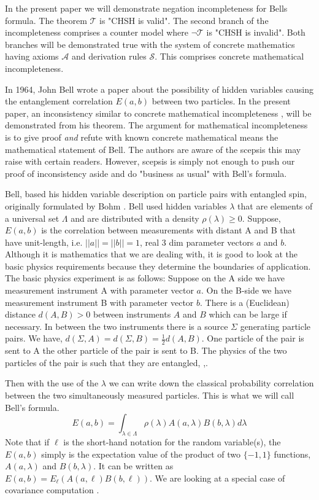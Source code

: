 \documentclass{appolb}
\begin{document}
In the present paper we will demonstrate negation incompleteness for Bells formula. The theorem $\mathcal{T}$ is "CHSH is valid". The second branch of the incompleteness comprises a counter model where $\neg\mathcal{T}$ is "CHSH is invalid". Both branches will be demonstrated true with the system of concrete mathematics having axioms $\mathcal{A}$ and derivation rules $\mathcal{S}$. This comprises concrete mathematical incompleteness.

In 1964, John Bell wrote a paper \cite{2} about the possibility of hidden variables \cite{1} causing the entanglement correlation $E(a,b)$ between two particles. In the present paper, an inconsistency similar to concrete mathematical incompleteness \cite{ProfFriedman}, will be demonstrated from his theorem. The argument for mathematical  incompleteness is to give proof {\it and} refute with known concrete mathematical means the mathematical statement of Bell. The authors are aware of the scepsis this may raise with certain readers. However, scepsis is simply not enough to push our proof of inconsistency aside and do "business as usual" with Bell's formula.

Bell, based his hidden variable description on particle pairs with entangled spin, originally formulated by Bohm \cite{3}. Bell used  hidden variables $\lambda$ that are elements of a universal set $ \Lambda$ and are distributed with a density $\rho(\lambda)\geq 0$. 
Suppose, $E(a,b)$ is the correlation between measurements with distant A and B that have unit-length, i.e. $||a||=||b||=1$, real 3 dim parameter vectors $a$ and $b$.
Although it is mathematics that we are dealing with, it is good to look at the basic physics requirements because they determine the boundaries of application.
The basic physics experiment is as follows: 
Suppose on the A side we have measurement instrument A with parameter vector $a$. On the B-side we have measurement instrument B with parameter vector $b$. There is a (Euclidean) distance $d(A,B)>0$ between instruments $A$ and $B$ which can be large if necessary.
In between the two instruments there is a source $\Sigma$ generating particle pairs. We have, $d(\Sigma,A)=d(\Sigma,B)=\frac{1}{2}d(A,B)$. One particle of the pair is sent to A the other particle of the pair is sent to B. The physics of the two particles of the pair is such that they are entangled, \cite{3},\cite{4}.

Then with the use of the $\lambda$ we can write down the classical probability correlation between the two simultaneously measured particles. This is what we will call Bell's formula.
\begin{equation}\label{1}
E(a,b)=\int_{\lambda \in \Lambda} \rho(\lambda)A(a,\lambda)B(b,\lambda) d\lambda
\end{equation}
Note that if $\ell$ is the short-hand notation for the random variable(s), the $E(a,b)$ simply is the expectation value of the product of two $\{-1,1\}$ functions, 
$A(a,\lambda)$ and $B(b,\lambda)$. It can be written as $E(a,b)=E_{\ell}\left( A(a,\ell)B(b,\ell)\right)$. We are looking at a special case of covariance computation \cite{Hogg}.
\end{document}
